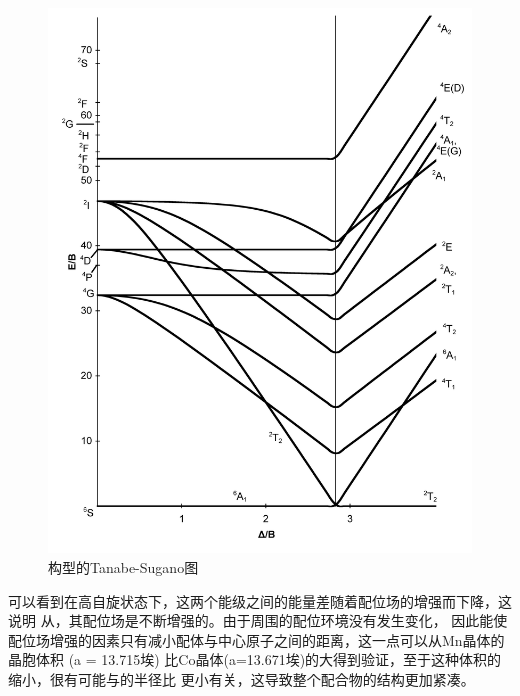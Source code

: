 \documentclass[a4paper,zihao=5,UTF8]{ctexart}
\begin{document}
	\begin{figure}[htbp]
		\centering
		\includegraphics[scale=0.10]{D5_Tanabe-Sugano_diagram.png}
		\caption{构型的Tanabe-Sugano图}
	\end{figure}
	可以看到在高自旋状态下，这两个能级之间的能量差随着配位场的增强而下降，这说明
	从，其配位场是不断增强的。由于周围的配位环境没有发生变化，
	因此能使配位场增强的因素只有减小配体与中心原子之间的距离，这一点可以从Mn晶体的晶胞体积
	(a = 13.715埃)
	比Co晶体(a=13.671埃)的大得到验证，至于这种体积的缩小，很有可能与的半径比
	更小有关，这导致整个配合物的结构更加紧凑。
\end{document}
